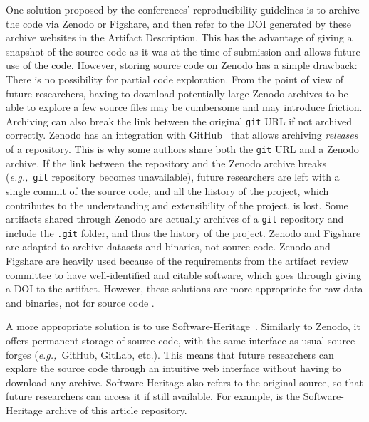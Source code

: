 \documentclass[sigconf,natbib=false]{acmart}
\newcommand{\eg}{\emph{e.g.,}}
\newcommand{\ad}{Artifact Description}
\begin{document}
One solution proposed by the conferences' reproducibility guidelines is to archive the code via Zenodo or Figshare, and then refer to the DOI generated by these archive websites in the \ad.
This has the advantage of giving a snapshot of the source code as it was at the time of submission and allows future use of the code.
However, storing source code on Zenodo has a simple drawback: There is no possibility for partial code exploration.
From the point of view of future researchers, having to download potentially large Zenodo archives to be able to explore a few source files may be cumbersome and may introduce friction.
Archiving can also break the link between the original \texttt{git} URL if not archived correctly.
Zenodo has an integration with GitHub\ \cite{github_zenodo} that allows archiving \emph{releases} of a repository.
This is why some authors share both the \texttt{git} URL and a Zenodo archive.
If the link between the repository and the Zenodo archive breaks (\eg\ \texttt{git} repository becomes unavailable), future researchers are left with a single commit of the source code, and all the history of the project, which contributes to the understanding and extensibility of the project, is lost.
Some artifacts shared through Zenodo are actually archives of a \texttt{git} repository and include the \texttt{.git} folder, and thus the history of the project.
Zenodo and Figshare are adapted to archive datasets and binaries, not source code.
Zenodo and Figshare are heavily used because of the requirements from the artifact review committee to have well-identified and citable software, which goes through giving a DOI to the artifact.
However, these solutions are more appropriate for raw data and binaries, not for source code \cite{alliez2019attributing, software_heritage_2017}.

A more appropriate solution is to use Software-Heritage\ \cite{swheritage, di2017software}.
Similarly to Zenodo, it offers permanent storage of source code, with the same interface as usual source forges (\eg\ GitHub, GitLab, etc.).
This means that future researchers can explore the source code through an intuitive web interface without having to download any archive.
Software-Heritage also refers to the original source, so that future researchers can access it if still available.
For example, \cite{artefact-lifetime} is the Software-Heritage archive of this article repository.
\end{document}
